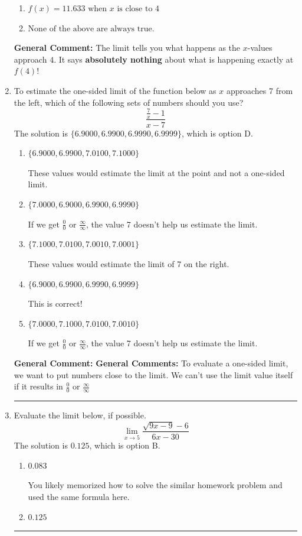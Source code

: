 \documentclass{extbook}[14pt]
\newcommand{\litem}[1]{\item #1

\rule{\textwidth}{0.4pt}}
\begin{document}
\begin{enumerate}
{\begin{enumerate}[label=\Alph*.]
\item \( f(x) = 11.633 \text{ when } x \text{ is close to } 4 \)


\item \( \text{None of the above are always true.} \)


\end{enumerate}

\textbf{General Comment:} The limit tells you what happens as the $x$-values approach $4$. It says \textbf{absolutely nothing} about what is happening exactly at $f(4)$!
}
\litem{
To estimate the one-sided limit of the function below as $x$ approaches 7 from the left, which of the following sets of numbers should you use?
\[ \frac{\frac{7}{x} - 1}{x - 7} \]The solution is \( \{ 6.9000, 6.9900, 6.9990, 6.9999 \} \), which is option D.\begin{enumerate}[label=\Alph*.]
\item \( \{ 6.9000, 6.9900, 7.0100, 7.1000 \} \)

These values would estimate the limit at the point and not a one-sided limit.
\item \( \{ 7.0000, 6.9000, 6.9900, 6.9990 \} \)

If we get $\frac{0}{0}$ or $\frac{\infty}{\infty}$, the value 7 doesn't help us estimate the limit.
\item \( \{ 7.1000, 7.0100, 7.0010, 7.0001 \} \)

These values would estimate the limit of 7 on the right.
\item \( \{ 6.9000, 6.9900, 6.9990, 6.9999 \} \)

This is correct!
\item \( \{ 7.0000, 7.1000, 7.0100, 7.0010 \} \)

If we get $\frac{0}{0}$ or $\frac{\infty}{\infty}$, the value 7 doesn't help us estimate the limit.
\end{enumerate}

\textbf{General Comment:} \textbf{General Comments:} To evaluate a one-sided limit, we want to put numbers close to the limit. We can't use the limit value itself if it results in $\frac{0}{0}$ or $\frac{\infty}{\infty}$
}
\litem{
Evaluate the limit below, if possible.
\[ \lim_{x \rightarrow 5} \frac{\sqrt{9x - 9} - 6}{6x - 30} \]The solution is \( 0.125 \), which is option B.\begin{enumerate}[label=\Alph*.]
\item \( 0.083 \)

You likely memorized how to solve the similar homework problem and used the same formula here.
\item \( 0.125 \)


\end{enumerate}}
\end{enumerate}
\end{document}
